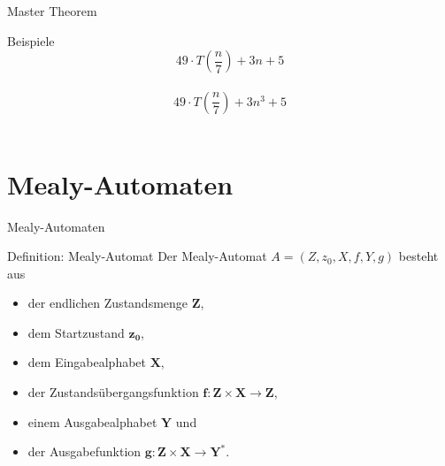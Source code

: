 	\begin{frame}{Master Theorem}
		\begin{exampleblock}{Beispiele}
			\[49 \cdot T( \frac{n}{7} ) + 3n + 5\]\\
			\[49 \cdot T( \frac{n}{7} ) + 3n^3 + 5\]\\
		\end{exampleblock}
	\end{frame}
	
	
	
	\section{Mealy-Automaten}
	\begin{frame}{Mealy-Automaten}
		\begin{block}{Definition: Mealy-Automat}
        Der Mealy-Automat $A = \left( Z, z_0, X, f, Y, g \right)$ besteht aus
        \begin{itemize}
            \item der endlichen Zustandsmenge $\mathbf{Z}$,
            \item dem Startzustand $\mathbf{z_0}$,
            \item dem Eingabealphabet $\mathbf{X}$,
            \item der Zustandsübergangsfunktion $\mathbf{f: Z\times X \rightarrow Z}$,
            \item einem Ausgabealphabet $\mathbf{Y}$ und
            \item der Ausgabefunktion $\mathbf{g: Z\times X \rightarrow Y^*}$.
        \end{itemize}
    \end{block}
	\end{frame}
	
